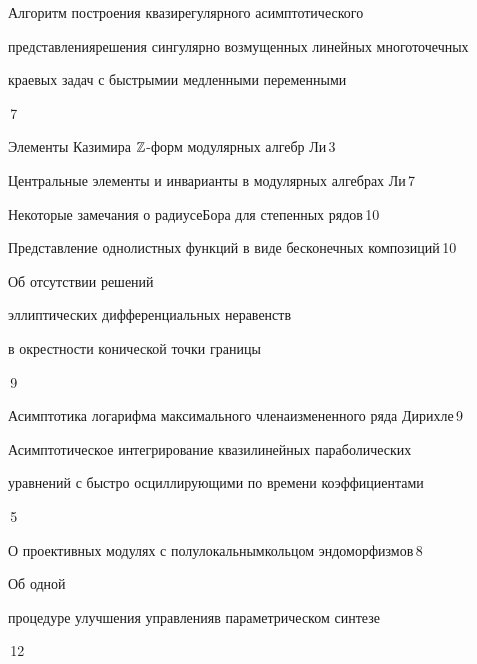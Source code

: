 

{Алгоритм построения квазирегулярного асимптотического 


представления\newline решения сингулярно возмущенных линейных многоточечных 


краевых задач с быстрыми\newline и медленными переменными}{\No\,7}




{Элементы Казимира $\Bbb Z$-форм модулярных алгебр Ли}{\No\,3}




{Центральные элементы и инварианты в модулярных алгебрах Ли}{\No\,7}




{Некоторые замечания о радиусе\newline Бора для степенных рядов}{\No\,10}




{Представление однолистных функций  в виде бесконечных композиций}{\No\,10}




{Об отсутствии решений


эллиптических дифференциальных неравенств\newline


в окрестности конической точки границы}{\No\,9}




{Асимптотика логарифма максимального члена\newline измененного ряда Дирихле}{\No\,9}




{Асимптотическое интегрирование квазилинейных параболических\newline


уравнений с быстро осциллирующими по времени коэффициентами}{\No\,5}




{О проективных модулях с полулокальным\newline кольцом эндоморфизмов}{\No\,8}




{Об одной 


процедуре улучшения управления\newline в параметрическом синтезе}{\No\,12}


